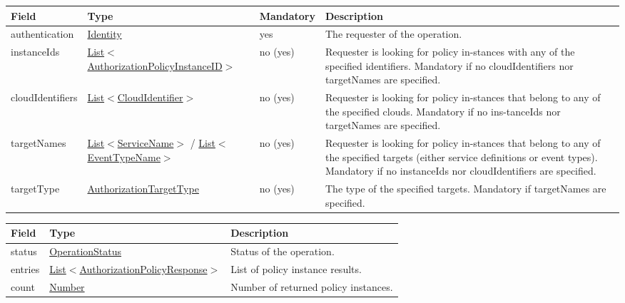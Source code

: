 \documentclass[a4paper]{arrowhead}
\newcommand{\pref}[1]{{\textcolor{ArrowheadGrey}{\hyperref[sec:model:primitives:#1]{#1}}}}
\begin{document}
\clearpage


\begin{table}[ht!]
\begin{tabularx}{\textwidth}{| p{3cm} | p{5.5cm} | p{2cm} | X |} \hline
\rowcolor{gray!33} Field & Type & Mandatory & Description \\ \hline
authentication &\hyperref[sec:model:Identity]{Identity} & yes & The requester of the operation. \\ \hline
instanceIds & \pref{List}$<$\pref{AuthorizationPolicyInstanceID}$>$ & no (yes) & Requester is looking for policy in-stances with any of the specified identifiers. Mandatory if no cloudIdentifiers nor targetNames are specified. \\ \hline
cloudIdentifiers & \pref{List}$<$\pref{CloudIdentifier}$>$ & no (yes) & Requester is looking for policy in-stances that belong to any of the specified clouds. Mandatory if no ins-tanceIds nor targetNames are specified. \\ \hline
targetNames & \pref{List}$<$\pref{ServiceName}$>$ / \pref{List}$<$\pref{EventTypeName}$>$ & no (yes) & Requester is looking for policy in-stances that belong to any of the specified targets (either service definitions or event types). Mandatory if no instanceIds nor cloudIdentifiers are specified. \\ \hline
targetType & \pref{AuthorizationTargetType} & no (yes) & The type of the specified targets. Mandatory if targetNames are specified. \\ \hline
\end{tabularx}
\end{table}


\begin{table}[ht!]
\begin{tabularx}{\textwidth}{| p{2.5cm} | p{5.5cm} | X |} \hline
\rowcolor{gray!33} Field & Type    & Description \\ \hline
status & \pref{OperationStatus} & Status of the operation. \\ \hline
entries & \pref{List}$<$\hyperref[sec:model:AuthorizationPolicyResponse]{AuthorizationPolicyResponse}$>$  & List of policy instance results. \\ \hline
count & \pref{Number} & Number of returned policy instances. \\ \hline
\end{tabularx}
\end{table}
\end{document}
